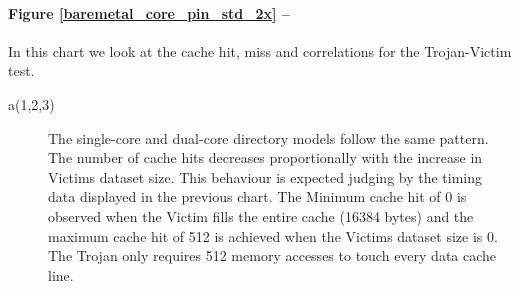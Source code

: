 				\paragraph{Figure \ref{baremetal_core_pin_std_2x} --}
					In this chart we look at the cache hit, miss and correlations for the Trojan-Victim test.
					\begin{description}
					\item [a(1,2,3)] 
						The single-core and dual-core directory models follow the same pattern. The number of cache hits decreases proportionally with the increase in Victims dataset size. This behaviour is expected judging by the timing data displayed in the previous chart. 
						The Minimum cache hit of 0 is observed when the Victim fills the entire cache (16384 bytes) and the maximum cache hit of 512 is achieved when the Victims dataset size is 0. The Trojan only requires 512 memory accesses to touch every data cache line. 
						

\end{description}
